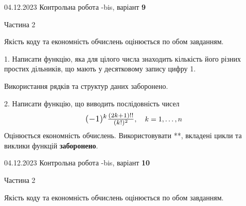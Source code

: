 \documentclass[12pt, ukrainian]{article}
\begin{document}
{{{{{{{{\begin {Large}
\end{Large}\newpage




\begin {Huge}
{{04.12.2023 Контрольна робота -bis, варіант  \No \textbf { 9 }\par}}

\begin{center}Частина 2
\end{center}
\vspace{10mm}
\end {Huge}

{
\begin {Large}
Якість коду та економність обчислень оцінюється по обом завданням. 

\vspace{5mm}

1. Написати функцію, яка для цілого числа знаходить кількість його різних простих дільників, що мають у десятковому запису цифру 1.

 Використання рядків та структур даних заборонено. 



\vspace{10mm}



2. 
Написати функцію, що виводить послідовність чисел
$$\scalebox{1.2}{$(-1)^{k}\frac{(2k+1)!!}{(k!)^2}$}, \quad k=1,\ldots,n$$
Оцінюється економність обчислень. Використовувати **, вкладені цикли та виклики функцій \textbf{заборонено}.

\end{Large}\newpage




\begin {Huge}
{{04.12.2023 Контрольна робота -bis, варіант  \No \textbf { 10 }\par}}

\begin{center}Частина 2
\end{center}
\vspace{10mm}
\end {Huge}

{
\begin {Large}
Якість коду та економність обчислень оцінюється по обом завданням. 

\vspace{5mm}


\end{Large}}}}}}}}}}}
\end{document}
